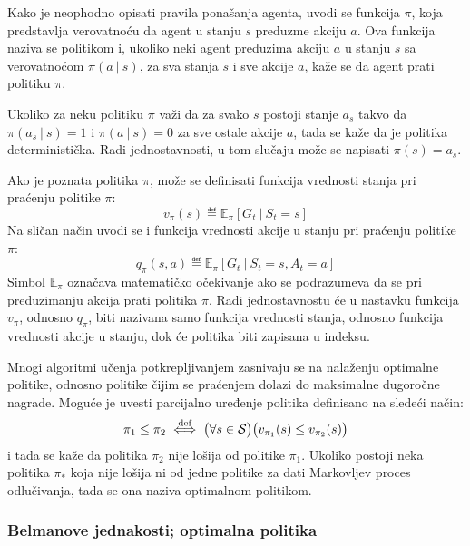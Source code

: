 Kako je neophodno opisati pravila ponašanja agenta, uvodi se funkcija $\pi$, koja predstavlja verovatnoću da agent u stanju $s$ preduzme akciju $a$. Ova funkcija naziva se politikom i, ukoliko neki agent preduzima akciju $a$ u stanju $s$ sa verovatnoćom $\pi(a~|~s)$, za sva stanja $s$ i sve akcije $a$, kaže se da agent prati politiku $\pi$. 

Ukoliko za neku politiku $\pi$ važi da za svako $s$ postoji stanje $a_s$ takvo da $\pi(a_s~|~s)=1$ i $\pi(a~|~s)=0$ za sve ostale akcije $a$, tada se kaže da je politika deterministička. Radi jednostavnosti, u tom slučaju može se napisati $\pi(s)=a_s$.
\par 
Ako je poznata politika $\pi$, može se definisati funkcija vrednosti stanja pri praćenju politike $\pi$:
\begin{equation}
	v_{\pi}(s) \eqdef \mathbb{E}_{\pi}[G_t~|~S_t=s]
\end{equation}
Na sličan način uvodi se i funkcija vrednosti akcije u stanju pri praćenju politike $\pi$:
\begin{equation}
	q_{\pi}(s, a) \eqdef \mathbb{E}_{\pi}[G_t~|~S_t=s, A_t=a]
\end{equation}
Simbol $\mathbb{E}_{\pi}$ označava matematičko očekivanje ako se podrazumeva da se pri preduzimanju akcija prati politika $\pi$. Radi jednostavnostu će u nastavku funkcija $v_{\pi}$, odnosno $q_{\pi}$, biti nazivana samo funkcija vrednosti stanja, odnosno funkcija vrednosti akcije u stanju, dok će politika biti zapisana u indeksu.
\par 
Mnogi algoritmi učenja potkrepljivanjem zasnivaju se na nalaženju optimalne politike, odnosno politike čijim se praćenjem dolazi do maksimalne dugoročne nagrade. Moguće je uvesti parcijalno uređenje politika definisano na sledeći način:
\begin{equation}
	\label{eq:nije_losija}
	\pi_1 \leq \pi_2 \stackrel{\text{def}}{\iff} \big(\forall s \in \mathcal{S}\big) \big( v_{\pi_1}(s) \leq v_{\pi_2}(s)\big)
\end{equation}
i tada se kaže da politika $\pi_2$ nije lošija  od politike $\pi_1$. Ukoliko postoji neka politika $\pi_*$ koja nije lošija ni od jedne politike za dati Markovljev proces odlučivanja, tada se ona naziva optimalnom politikom. 

\subsubsection{Belmanove jednakosti; optimalna politika}

